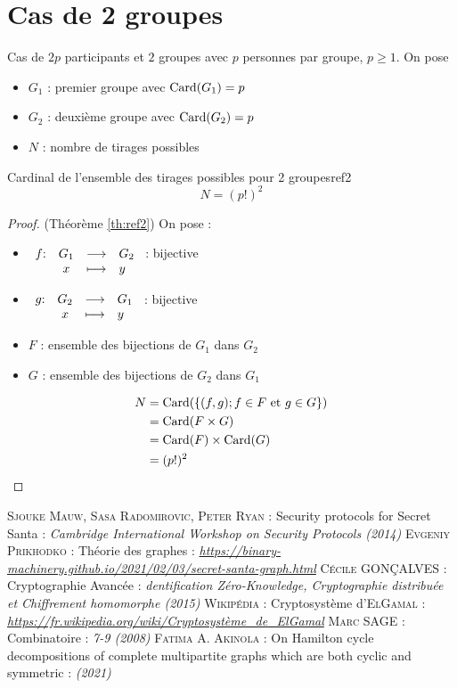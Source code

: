\documentclass[a4paper, 12pt]{report}
\begin{document}
    \section{Cas de 2 groupes}
        \noindent Cas de $2p$ participants et $2$ groupes avec $p$ personnes par groupe, $p \geqslant 1$. On pose
        \begin{itemize}
            \item $G_1$ : premier groupe avec $\mathop{\mathrm{Card}}\nolimits(G_1)= p$
            \item $G_2$ : deuxième groupe avec $\mathop{\mathrm{Card}}\nolimits(G_2)= p$
            \item $N$ : nombre de tirages possibles
        \end{itemize}
        \begin{theorem}{Cardinal de l'ensemble des tirages possibles pour 2 groupes}{ref2}
            \[N=(p!)^{2}\]
        \end{theorem}
        \begin{proof}
            (Théorème \ref{th:ref2})
            \bigbreak
            On pose : 
            \bigbreak
        \begin{itemize}
            \item $\begin{array}[t]{r c c l} f \textnormal{:}& G_1 & \longrightarrow & G_2 \\ & x & \longmapsto & y \end{array}$ : bijective
            \item $\begin{array}[t]{r c c l} g \textnormal{:}& G_2 & \longrightarrow & G_1 \\ & x & \longmapsto & y \end{array}$ : bijective
            \item $F$ : ensemble des bijections de $G_1$ dans $G_2$
            \item $G$ : ensemble des bijections de $G_2$ dans $G_1$
        \end{itemize}
        \begin{align*}
            N
            &=\mathop{\mathrm{Card}}\nolimits(\{(f,g) ; f \in F \text{ et  }g \in G\}) \\
            &=\mathop{\mathrm{Card}}\nolimits(F\times G) \\
            &=\mathop{\mathrm{Card}}\nolimits(F)\times \mathop{\mathrm{Card}}\nolimits(G) \\
            &=(p!)^{2} 
        \end{align*}
        \end{proof}

\begin{thebibliography}{6}
     \textsc{Sjouke Mauw, Sasa Radomirovic, Peter Ryan} : Security protocols for Secret Santa : \textit{Cambridge International Workshop on Security Protocols (2014)}
     \textsc{Evgeniy Prikhodko} : Théorie des graphes : \textit{\url{https://binary-machinery.github.io/2021/02/03/secret-santa-graph.html}}
     \textsc{Cécile GONÇALVES} : Cryptographie Avancée : \textit{dentification Zéro-Knowledge, Cryptographie distribuée et Chiffrement homomorphe (2015)}
     \textsc{Wikipédia} : Cryptosystème d’\textsc{ElGamal} : \textit{\url{https://fr.wikipedia.org/wiki/Cryptosystème_de_ElGamal}}
     \textsc{Marc SAGE} : Combinatoire : \textit{7-9 (2008)}
     \textsc{Fatima A. Akinola} : On Hamilton cycle decompositions of complete multipartite graphs which are both cyclic and symmetric : \textit{(2021)}
\end{thebibliography}
            
\end{document}
